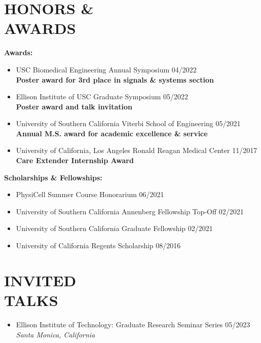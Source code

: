 \documentclass[margin, 10pt]{res} %
\begin{document}
\begin{resume}
\section{HONORS \& \\ AWARDS}
\textbf{Awards:}
\begin{itemize} \itemsep -2pt
    \item USC Biomedical Engineering Annual Symposium \hfill 04/2022 \\
    \textbf{\small{Poster award for 3rd place in signals \& systems section}}
    \item Ellison Institute of USC Graduate Symposium \hfill 05/2022 \\
    \textbf{\small{Poster award and talk invitation}} 
    \item University of Southern California Viterbi School of Engineering \hfill 05/2021 \\
    \textbf{\small{Annual M.S. award for academic excellence \& service}}
    \item University of California, Los Angeles Ronald Reagan Medical Center \hfill 11/2017 
    \textbf{\small{Care Extender Internship Award}} 

\end{itemize}

\textbf{Scholarships \& Fellowships:}
\begin{itemize} \itemsep -2pt
    \item PhysiCell Summer Course Honorarium \hfill 06/2021
    \item University of Southern California Annenberg Fellowship Top-Off \hfill 02/2021
    \item University of Southern California Graduate Fellowship \hfill 02/2021
    \item University of California Regents Scholarship \hfill 08/2016
\end{itemize}


\section{INVITED \\ TALKS}
\begin{itemize} \itemsep -2pt
    \item Ellison Institute of Technology: Graduate Research Seminar Series \hfill  05/2023 \\ 
    \emph{\small{Santa Monica, California}}
\end{itemize}


\end{resume}
\end{document}
